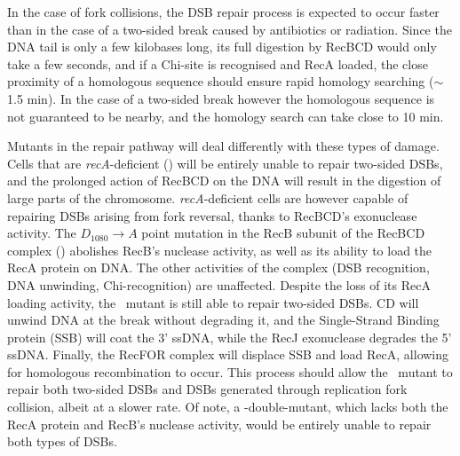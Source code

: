 In the case of fork collisions, the DSB repair process is expected to occur faster than in the case of a two-sided break caused by antibiotics or radiation. Since the DNA tail is only a few kilobases long, its full digestion by RecBCD would only take a few seconds, and if a Chi-site is recognised and RecA loaded, the close proximity of a homologous sequence should ensure rapid homology searching ($\sim$1.5 min)\cite{Amarh2018}. In the case of a two-sided break however the homologous sequence is not guaranteed to be nearby, and the homology search can take close to 10 min\cite{Wiktor2021}.

Mutants in the repair pathway will deal differently with these types of damage. Cells that are \emph{recA}-deficient (\dreca) will be entirely unable to repair two-sided DSBs, and the prolonged action of RecBCD on the DNA will result in the digestion of large parts of the chromosome\cite{Horii1968, Chow2007}. \emph{recA}-deficient cells are however capable of repairing DSBs arising from fork reversal, thanks to RecBCD's exonuclease activity\cite{Seigneur1998, Michel2001}. The $D_{1080} \rightarrow A$ point mutation in the RecB subunit of the RecBCD complex (\teneighty) abolishes RecB's nuclease activity, as well as its ability to load the RecA protein on DNA\cite{Yu1998, Wang2000}. The other activities of the complex (DSB recognition, DNA unwinding, Chi-recognition) are unaffected\cite{Anderson1999}. Despite the loss of its RecA loading activity, the \teneighty\ mutant is still able to repair two-sided DSBs. \teneighty CD will unwind DNA at the break without degrading it, and the Single-Strand Binding protein (SSB) will coat the 3' ssDNA, while the RecJ exonuclease degrades the 5' ssDNA. Finally, the RecFOR complex will displace SSB and load RecA, allowing for homologous recombination to occur\cite{Ivancic-Bace_2003}. This process should allow the \teneighty\ mutant to repair both two-sided DSBs and DSBs generated through replication fork collision, albeit at a slower rate. Of note, a \dreca-\teneighty double-mutant, which lacks both the RecA protein and RecB's nuclease activity, would be entirely unable to repair both types of DSBs.

